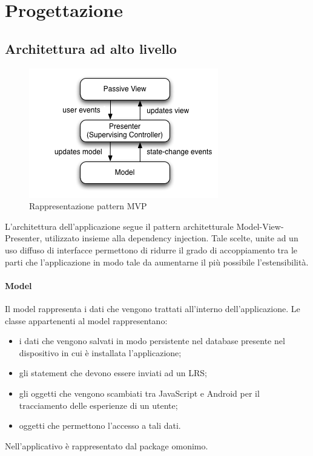 \documentclass[../Tesi.tex]{subfiles}
\begin{document}
\section{Progettazione}
	\subsection{Architettura ad alto livello}
		\begin{figure}[!h]
			\centering
			\includegraphics[scale=0.6]{images/mvp}
				\caption{Rappresentazione pattern MVP}
		\end{figure}

		L'architettura dell'applicazione segue il pattern architetturale Model-View-Presenter, utilizzato insieme alla dependency injection. Tale scelte, unite ad un uso diffuso di interfacce permettono di ridurre il grado di accoppiamento tra le parti che l'applicazione in modo tale da aumentarne il più possibile l'estensibilità.

		\paragraph*{Model}
		Il model rappresenta i dati che vengono trattati all'interno dell'applicazione. Le classe appartenenti al model rappresentano:
		\begin{itemize}
			\item i dati che vengono salvati in modo persistente nel database presente nel dispositivo in cui è installata l'applicazione;
			\item gli statement che devono essere inviati ad un LRS;
			\item gli oggetti che vengono scambiati tra JavaScript e Android per il tracciamento delle esperienze di un utente;
			\item oggetti che permettono l'accesso a tali dati.
		\end{itemize}
		Nell'applicativo è rappresentato dal package omonimo.
\end{document}

